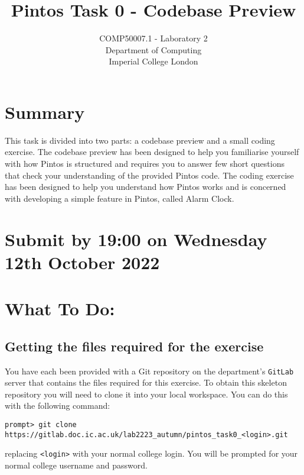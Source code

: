 \documentclass[a4paper,12pt]{article}
\newcommand{\shell}[1]{\lstinline!#1!}
\begin{document}

\title{Pintos Task 0 - Codebase Preview}
\date{}

\author{
COMP50007.1 - Laboratory 2 \\ 
Department of Computing \\ 
Imperial College London
}

\maketitle

\section*{Summary}
This task is divided into two parts: a codebase preview and a small coding exercise.
The codebase preview has been designed to help you familiarise yourself with how Pintos is structured 
and requires you to answer few short questions that check your understanding of the provided Pintos code.
The coding exercise has been designed to help you understand how Pintos works 
and is concerned with developing a simple feature in Pintos, called Alarm Clock.

\section*{Submit by 19:00 on Wednesday 12th October 2022}

\section*{What To Do:}

\subsection*{Getting the files required for the exercise}

You have each been provided with a Git repository on the department's \shell{GitLab} server that contains the files required for this exercise.
To obtain this skeleton repository you will need to clone it into your local workspace.
You can do this with the following command:
%
\begin{lstlisting}
prompt> git clone https://gitlab.doc.ic.ac.uk/lab2223_autumn/pintos_task0_<login>.git
\end{lstlisting}
%
replacing \shell{<login>} with your normal college login.
You will be prompted for your normal college username and password.
\end{document}
